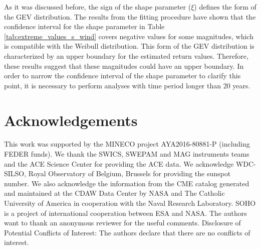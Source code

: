 \documentclass{article}
\begin{document}
As it was discussed before, the sign of the shape parameter ($\xi$) defines the form of the GEV distribution. The results from the fitting procedure have shown that the 
confidence interval for the shape parameter in Table \ref{tab:extreme_values_s_wind} covers negative values for some magnitudes, which is compatible with the Weibull distribution. This form of the GEV distribution is characterized by an upper boundary for the estimated return values. Therefore, these results suggest that these magnitudes could have an upper boundary.
In order to narrow the confidence interval of the shape parameter to clarify this point, it is necessary to perform analyses with time period longer than 20 years.


\section{Acknowledgements}
  This work was supported by the MINECO project AYA2016-80881-P (including FEDER funds). We thank the SWICS, SWEPAM and MAG instruments teams and the ACE Science Center for providing the ACE data. We acknowledge WDC-SILSO, Royal Observatory of Belgium, Brussels for providing the sunspot number. We also acknowledge the information from the CME catalog generated and maintained at the CDAW Data Center by NASA and The Catholic University of America in cooperation with the Naval Research Laboratory. SOHO is a project of international cooperation between ESA and NASA. The authors want to thank an anonymous reviewer for the useful comments.
Disclosure of Potential Conflicts of Interest: The authors declare that there are no conflicts of interest.

  
  
\end{document}
